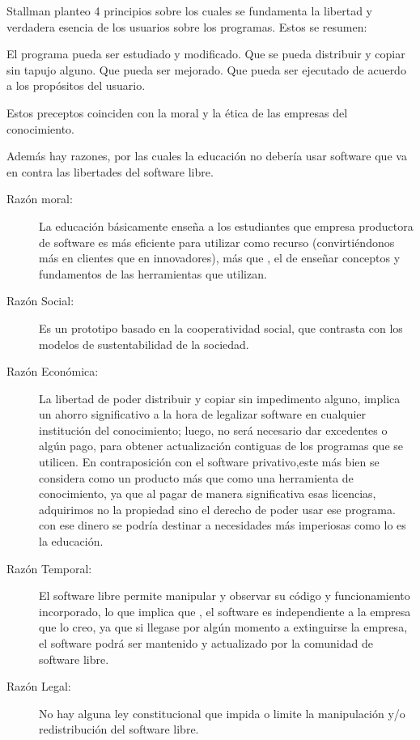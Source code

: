 Stallman planteo 4 principios sobre los cuales se fundamenta la
libertad y verdadera esencia de los usuarios sobre los
programas. Estos se resumen:

El programa pueda ser estudiado y modificado. Que se pueda
distribuir y copiar sin tapujo alguno. Que pueda ser mejorado.
Que pueda ser ejecutado de acuerdo a los propósitos del
usuario.

Estos preceptos coinciden con la moral y la ética de las
empresas del conocimiento.

Además hay razones, por las cuales la educación no debería usar
software que va en contra las libertades del software libre.

\begin{description}
	\item[Razón moral:]
		La educación básicamente enseña a los estudiantes que empresa productora de software es más eficiente para utilizar como recurso (convirtiéndonos más en clientes que en 
		innovadores), más que , el de enseñar conceptos y fundamentos de las herramientas que utilizan.
	
	\item[Razón Social:]
		Es un prototipo basado en la cooperatividad social, que contrasta con los modelos de sustentabilidad de la sociedad.
		
	\item[Razón Económica:]
		La libertad de poder distribuir y copiar sin impedimento alguno, implica un ahorro significativo a la hora de legalizar software en cualquier institución del conocimiento; 
		luego, no será necesario dar excedentes o algún pago, para obtener actualización contiguas de los programas que se utilicen. En contraposición con el software 
		privativo,este más bien se considera como un producto más que como una herramienta de conocimiento, ya que al pagar de manera significativa esas licencias, adquirimos no la 
		propiedad sino el derecho de poder usar ese programa. con ese dinero se podría destinar a necesidades más imperiosas como lo es la educación.
	
	\item[Razón Temporal:]
		El software libre permite manipular y observar su código y funcionamiento incorporado, lo que implica que , el software es independiente a la empresa que lo creo, ya que si
		llegase por algún momento a extinguirse la empresa, el software podrá ser mantenido y actualizado por la comunidad de software libre.
	
	\item[Razón Legal:]
		No hay alguna ley constitucional que impida o limite la manipulación y/o redistribución del software libre.

		
\end{description}

